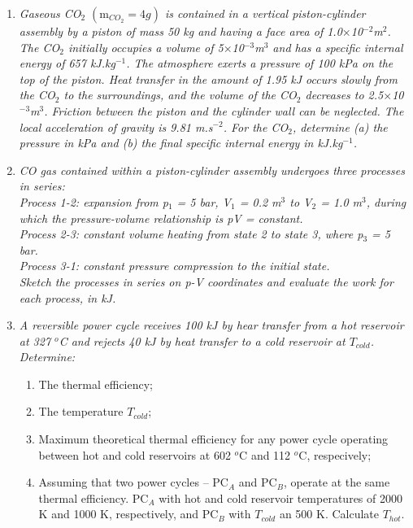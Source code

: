 \documentclass[12pts,a4paper,amsmath,amssymb,floatfix]{article}%
\begin{document}
\begin{enumerate}[label=\bfseries Problem \arabic*:]
\item {\it Gaseous CO$_{2}$ $\left(\text{m}_{CO_{2}}=4g\right)$ is contained in a vertical piston-cylinder assembly by a piston of mass 50 kg and having a face area of 1.0$\times$10$^{-2}$m$^{2}$. The CO$_{2}$ initially occupies a volume of 5$\times$10$^{-3}$m$^{3}$ and has a specific internal energy of 657 kJ.kg$^{-1}$.  The atmosphere exerts a pressure of 100 kPa on the top of the piston. Heat transfer in the amount  of 1.95 kJ occurs slowly from the CO$_{2}$ to the surroundings, and the volume of the CO$_{2}$ decreases to 2.5$\times$10$^{-3}$m$^{3}$. Friction between the piston and the cylinder wall can be neglected. The local acceleration of gravity is 9.81 m.s$^{-2}$. For the CO$_{2}$, determine (a) the pressure in kPa and (b) the final specific internal energy in kJ.kg$^{-1}$.}

\item {\it CO gas contained within a piston-cylinder assembly undergoes three processes in series:\\
       Process 1-2: expansion from p$_{1}$ = 5 bar, V$_{1}$ = 0.2 m$^{3}$ to V$_{2}$ = 1.0 m$^{3}$, during which the pressure-volume relationship is pV = constant.\\
       Process 2-3: constant volume heating from state 2 to state 3, where p$_{3}$ = 5 bar.\\
       Process 3-1: constant pressure compression to the initial state.\\
       Sketch the processes in series on p-V coordinates and evaluate the work for each process, in kJ.}


\item {\it A reversible power cycle receives 100 kJ by hear transfer from a hot reservoir at 327 $^{o}$C and rejects 40 kJ by heat transfer to a cold reservoir at $T_{cold}$. Determine:
\begin{enumerate}
\item The thermal efficiency;
\item The temperature $T_{cold}$;
\item Maximum theoretical thermal efficiency for any power cycle operating between hot and cold reservoirs at 602 $^{o}$C and 112 $^{o}$C, respecively;
\item Assuming that two power cycles -- PC$_{A}$ and PC$_{B}$, operate at the same thermal efficiency. PC$_{A}$ with hot and cold reservoir temperatures of 2000 K and 1000 K, respectively, and PC$_{B}$ with $T_{cold}$ an 500 K. Calculate $T_{hot}$.
\end{enumerate}
}



\end{enumerate}
\end{document}
